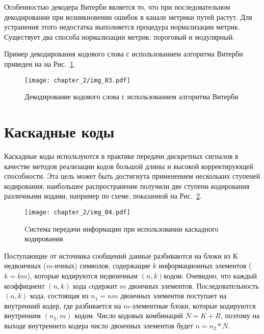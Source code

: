 Особенностью декодера Витерби является то, что при последовательном декодировании при возникновении
ошибок в канале метрики путей растут. Для устранения этого недостатка выполняется процедура
нормализации метрик. Существует два способа нормализации метрик: пороговый и модулярный.

Пример декодирования кодового слова с использованием алгоритма Витерби приведен на на Рис.~\ref{img_03}.

\begin{figure}[htbp]
\begin{center}
\texttt{[image: chapter\_2/img\_03.pdf]}
\end{center}
\caption{Декодирование кодового слова с использованием алгоритма Витерби}
\label{img_03}
\end{figure}

\section{Каскадные коды}
Каскадные коды используются в практике передачи дискретных сигналов в качестве методов реализации кодов 
большой длины и высокой корректирующей способности. Эта цель может быть достигнута применением нескольких 
ступеней кодирования; наибольшее распространение получили две ступени кодирования различными кодами, например 
по схеме, показанной на Рис.~\ref{img_04}.

\begin{figure}[htbp]
\begin{center}
\texttt{[image: chapter\_2/img\_04.pdf]}
\end{center}
\caption{Cистема передачи информации при использовании каскадного кодирования}
\label{img_04}
\end{figure}

Поступающие от источника сообщений данные разбиваются на блоки из $К$ недвоичных ($m$-ичных) символов, 
содержащие $k$ информационных элементов ($k=km$), которые кодируются недвоичным $(n, k)$кодом. Очевидно, что 
каждый коэффициент $(n, k )$ кода cодержит $m$ двоичных элементов. Последовательность $(n, k)$ кода, 
состоящая из $n_1=nm$ двоичных элементов поступает на внутренний кодер, где разбивается на $m$-элементные 
блоки, которые кодируются внутренним $(n_2, m)$ кодом. Число кодовых комбинаций $N=K+R$, поэтому на выходе 
внутреннего кодера число двоичных элементов будет $n=n_2*N$.

